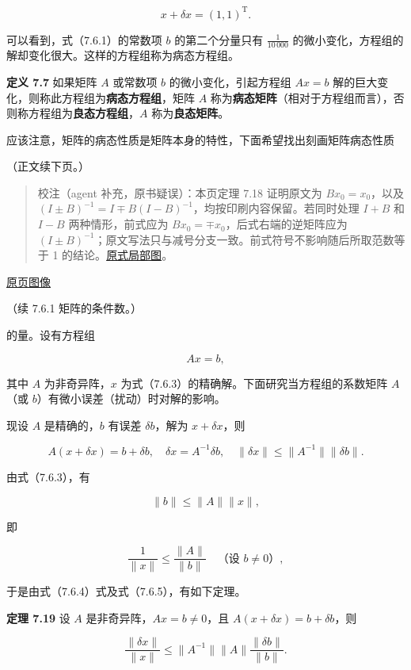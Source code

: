 \documentclass[
  10pt,
  fontset=fandol]{ctexart}
\begin{document}
\[
x+\delta x=(1,1)^{\mathrm T}.
\]

可以看到，式（7.6.1）的常数项 \(b\) 的第二个分量只有 \(\frac1{10\,000}\) 的微小变化，方程组的解却变化很大。这样的方程组称为病态方程组。

\textbf{定义 7.7} 如果矩阵 \(A\) 或常数项 \(b\) 的微小变化，引起方程组 \(Ax=b\) 解的巨大变化，则称此方程组为\textbf{病态方程组}，矩阵 \(A\) 称为\textbf{病态矩阵}（相对于方程组而言），否则称方程组为\textbf{良态方程组}，\(A\) 称为\textbf{良态矩阵}。

应该注意，矩阵的病态性质是矩阵本身的特性，下面希望找出刻画矩阵病态性质

（正文续下页。）

\begin{quote}
校注（agent 补充，原书疑误）：本页定理 7.18 证明原文为 \(Bx_0=x_0\)，以及 \((I\pm B)^{-1}=I\mp B(I-B)^{-1}\)，均按印刷内容保留。若同时处理 \(I+B\) 和 \(I-B\) 两种情形，前式应为 \(Bx_0=\mp x_0\)，后式右端的逆矩阵应为 \((I\pm B)^{-1}\)；原文写法只与减号分支一致。前式符号不影响随后所取范数等于 1 的结论。\href{../assets/ch07b/205-inverse-signs.png}{原式局部图}。
\end{quote}

\href{../../source-images/pdf-206.jpeg}{原页图像}

（续 7.6.1 矩阵的条件数。）

的量。设有方程组

\[
Ax=b,
\tag{7.6.3}
\]

其中 \(A\) 为非奇异阵，\(x\) 为式（7.6.3）的精确解。下面研究当方程组的系数矩阵 \(A\)（或 \(b\)）有微小误差（扰动）时对解的影响。

现设 \(A\) 是精确的，\(b\) 有误差 \(\delta b\)，解为 \(x+\delta x\)，则

\[
A(x+\delta x)=b+\delta b,\quad\delta x=A^{-1}\delta b,\quad\|\delta x\|\leqslant\|A^{-1}\|\|\delta b\|.
\tag{7.6.4}
\]

由式（7.6.3），有

\[
\|b\|\leqslant\|A\|\|x\|,
\]

即

\[
\frac1{\|x\|}\leqslant\frac{\|A\|}{\|b\|}\quad\text{（设 }b\neq0\text{）},
\tag{7.6.5}
\]

于是由式（7.6.4）式及式（7.6.5），有如下定理。

\textbf{定理 7.19} 设 \(A\) 是非奇异阵，\(Ax=b\neq0\)，且 \(A(x+\delta x)=b+\delta b\)，则

\[
\frac{\|\delta x\|}{\|x\|}\leqslant\|A^{-1}\|\|A\|\frac{\|\delta b\|}{\|b\|}.
\]
\end{document}
